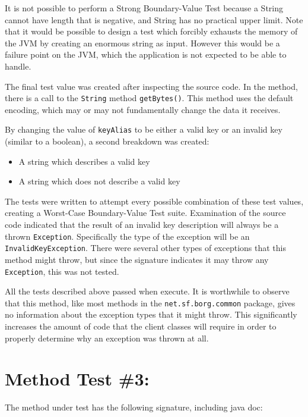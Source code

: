 It is not possible to perform a Strong Boundary-Value Test because a
String cannot have length that is negative, and String has no practical
upper limit. Note that it would be possible to design a test which
forcibly exhausts the memory of the JVM by creating an enormous string
as input. However this would be a failure point on the JVM, which the
application is not expected to be able to handle.

The final test value was created after inspecting the source code. In
the method, there is a call to the \lstinline!String! method
\lstinline!getBytes()!. This method uses the default encoding, which may
or may not fundamentally change the data it receives.

By changing the value of \lstinline!keyAlias! to be either a valid key
or an invalid key (similar to a boolean), a second breakdown was
created:

\begin{itemize}
\tightlist
\item
  A string which describes a valid key
\item
  A string which does not describe a valid key
\end{itemize}

The tests were written to attempt every possible combination of these
test values, creating a Worst-Case Boundary-Value Test suite.
Examination of the source code indicated that the result of an invalid
key description will always be a thrown \lstinline!Exception!.
Specifically the type of the exception will be an
\lstinline!InvalidKeyException!. There were several other types of
exceptions that this method might throw, but since the signature
indicates it may throw any \lstinline!Exception!, this was not tested.

All the tests described above passed when execute. It is worthwhile to
observe that this method, like most methods in the
\lstinline!net.sf.borg.common! package, gives no information about the
exception types that it might throw. This significantly increases the
amount of code that the client classes will require in order to properly
determine why an exception was thrown at all.

\section{Method Test \#3:}\label{method-test-3}

The method under test has the following signature, including java doc:

